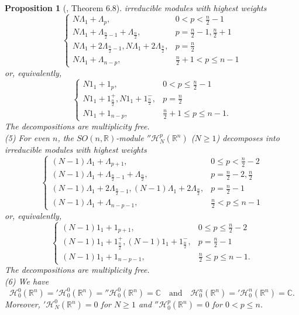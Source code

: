 \documentclass[a4paper,12pt,reqno]{amsart}
\newtheorem{prop}[theorem]{Proposition}
\numberwithin{theorem}{subsection}
\numberwithin{equation}{section}
\begin{document}
\begin{prop}[\cite{IT}, Theorem 6.8]
irreducible modules with highest weights
$$
\begin{cases}
   N \Lambda_1 + \Lambda_p, & 0 < p < \frac{n}{2}-1 \\
   N \Lambda_1 + \Lambda_{\frac{n}{2}-1}+ \Lambda_\frac{n}{2}, & p = \frac{n}{2}-1,\frac{n}{2}+1 \\
   N \Lambda_1 + 2\Lambda_{\frac{n}{2}-1}, N\Lambda_1 + 2\Lambda_{\frac{n}{2}}, & p = \frac{n}{2} \\
   N\Lambda_1 + \Lambda_{n-p}, & \frac{n}{2}+1 < p \le n-1
\end{cases}
$$
or, equivalently,
$$
\begin{cases}
   N 1_1 + 1_p, & 0 < p \le \frac{n}{2}-1 \\
   N 1_1 + 1_{\frac{n}{2}}^+, N 1_1 + 1_{\frac{n}{2}}^-, & p = \frac{n}{2} \\
   N 1_1 + 1_{n-p}, & \frac{n}{2}+1 \le p \le n-1.
\end{cases}
$$
The decompositions are multiplicity free. \\
(5) For even $n$, the $SO(n,{\mathbb{R}})$-module ${''{\mathcal H}}^p_N({\mathbb{R}}^n)$ ($N \ge 1$)
decomposes into irreducible modules with highest weights
$$
\begin{cases}
   (N\!-\!1) \Lambda_1 + \Lambda_{p+1}, & 0 \le p < \frac{n}{2}-2 \\
   (N\!-\!1) \Lambda_1 + \Lambda_{\frac{n}{2}-1}+ \Lambda_\frac{n}{2}, & p = \frac{n}{2}-2,\frac{n}{2} \\
   (N\!-\!1) \Lambda_1 + 2\Lambda_{\frac{n}{2}-1}, (N-1) \Lambda_1 + 2 \Lambda_{\frac{n}{2}}, & p = \frac{n}{2}-1 \\
   (N\!-\!1) \Lambda_1 + \Lambda_{n-p-1}, & \frac{n}{2} < p \le n-1
\end{cases}
$$
or, equivalently,
$$
\begin{cases}
   (N\!-\!1) 1_1 + 1_{p+1}, & 0 \le p \le \frac{n}{2}-2 \\
   (N\!-\!1) 1_1 + 1_{\frac{n}{2}}^+, (N\!-\!1) 1_1 + 1_{\frac{n}{2}}^-, & p = \frac{n}{2}-1 \\
   (N\!-\!1) 1_1 + 1_{n-p-1}, & \frac{n}{2} \le p \le n-1.
\end{cases}
$$
The decompositions are multiplicity free. \\
(6) We have
\begin{equation}
   {\mathcal H}_0^0 ({\mathbb{R}}^n) = {'{\mathcal H}}_0^0 ({\mathbb{R}}^n) = {''{\mathcal H}}_0^0({\mathbb{R}}^n) = {\mathbb{C}} \quad \mbox{and} \quad
   {\mathcal H}_0^n ({\mathbb{R}}^n) = {'{\mathcal H}}_0^n ({\mathbb{R}}^n) = {\mathbb{C}}.
\end{equation}
Moreover, ${'{\mathcal H}}_N^0({\mathbb{R}}^n) = 0$ for $N \ge 1$ and ${''{\mathcal H}}_0^p({\mathbb{R}}^n) = 0$ for
$0 < p \le n$.
\end{prop}
\end{document}

